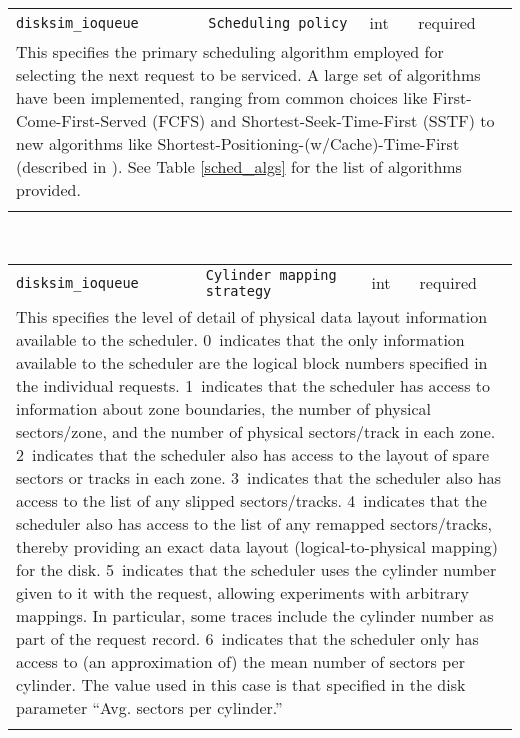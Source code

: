 \noindent 
\begin{tabular}{|p{\lpmodwidth}|p{\lpnamewidth}|p{0.5in}|p{0.5in}|}
\cline{1-4}
\texttt{disksim\_ioqueue} & \texttt{Scheduling policy} & int & required \\ 
\cline{1-4}
\multicolumn{4}{|p{6in}|}{
This specifies the primary scheduling algorithm employed for selecting
the next request to be serviced. A large set of algorithms have been
implemented, ranging from common choices like First-Come-First-Served
(FCFS) and Shortest-Seek-Time-First (SSTF) to new algorithms like
Shortest-Positioning-(w/Cache)-Time-First (described in
\cite{Worthington94}). See Table \ref{sched_algs} for the list of
algorithms provided.
}\\ 
\cline{1-4}
\multicolumn{4}{p{5in}}{}\\
\end{tabular}\\ 
\noindent 
\begin{tabular}{|p{\lpmodwidth}|p{\lpnamewidth}|p{0.5in}|p{0.5in}|}
\cline{1-4}
\texttt{disksim\_ioqueue} & \texttt{Cylinder mapping strategy} & int & required \\ 
\cline{1-4}
\multicolumn{4}{|p{6in}|}{
This specifies the level of detail of physical data layout information
available to the scheduler.
0~indicates that the only information available to the scheduler are
the logical block numbers specified in the individual requests.
1~indicates that the scheduler has access to information about zone
boundaries, the number of physical sectors/zone, and the number of
physical sectors/track in each zone.
2~indicates that the scheduler also has access to the layout of spare
sectors or tracks in each zone.
3~indicates that the scheduler also has access to the list of any
slipped sectors/tracks.
4~indicates that the scheduler also has access to the list of any
remapped sectors/tracks, thereby providing an exact data layout
(logical-to-physical mapping) for the disk.
5~indicates that the scheduler uses the cylinder number given to it
with the request, allowing experiments with arbitrary mappings. In
particular, some traces include the cylinder number as part of the
request record.
6~indicates that the scheduler only has access to (an approximation
of) the mean number of sectors per cylinder. The value used in this
case is that specified in the disk parameter ``Avg. sectors per
cylinder.''
}\\ 
\cline{1-4}
\multicolumn{4}{p{5in}}{}\\
\end{tabular}\\ 
